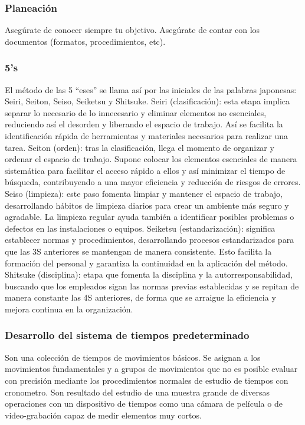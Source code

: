     \subsubsection{Planeación}
    
    Asegúrate de conocer siempre tu objetivo.
    Asegúrate de contar con los documentos (formatos, procedimientos, etc).
    \subsubsection{5's}
     El método de las 5 “eses” se llama así por las iniciales de las palabras japonesas: Seiri, Seiton, Seiso, Seiketsu y Shitsuke.
     Seiri (clasificación): esta etapa implica separar lo necesario de lo innecesario y eliminar elementos no esenciales, reduciendo así el desorden y liberando el espacio de trabajo. Así se facilita la identificación rápida de herramientas y materiales necesarios para realizar una tarea.  
    Seiton (orden): tras la clasificación, llega el momento de organizar y ordenar el espacio de trabajo. Supone colocar los elementos esenciales de manera sistemática para facilitar el acceso rápido a ellos y así minimizar el tiempo de búsqueda, contribuyendo a una mayor eficiencia y reducción de riesgos de errores.  
    Seiso (limpieza): este paso fomenta limpiar y mantener el espacio de trabajo, desarrollando hábitos de limpieza diarios para crear un ambiente más seguro y agradable. La limpieza regular ayuda también a identificar posibles problemas o defectos en las instalaciones o equipos.  
    Seiketsu (estandarización): significa establecer normas y procedimientos, desarrollando procesos estandarizados para que las 3S anteriores se mantengan de manera consistente. Esto facilita la formación del personal y garantiza la continuidad en la aplicación del método.  
    Shitsuke (disciplina): etapa que fomenta la disciplina y la autorresponsabilidad, buscando que los empleados sigan las normas previas establecidas y se repitan de manera constante las 4S anteriores, de forma que se arraigue la eficiencia y mejora continua en la organización. 
    \cite{5's}
    \subsubsection{Desarrollo del sistema de tiempos predeterminado}
    Son una colección de tiempos de movimientos básicos. Se asignan a los movimientos fundamentales y a grupos de movimientos que no es posible evaluar con precisión mediante los procedimientos normales de estudio de tiempos con cronometro. Son resultado del estudio de una muestra grande de diversas operaciones con un dispositivo de tiempos como una cámara de película o de video-grabación capaz de medir elementos muy cortos.
    \cite{Sistemadetiempospredeterminados}
